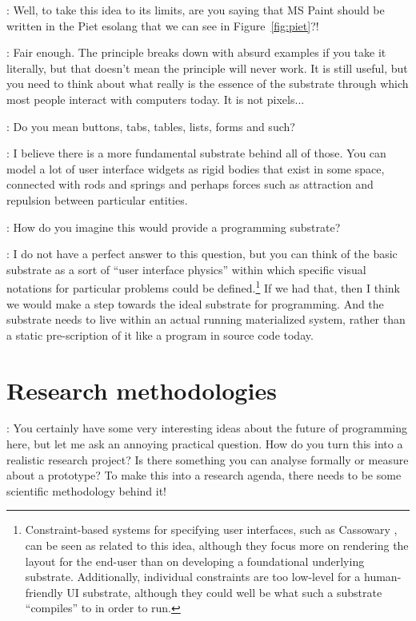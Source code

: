 \documentclass[runningheads]{llncs}
\newcommand{\T}{Tomas}
\newcommand{\J}{Joel}
\newcommand{\says}[2][gg]{\vspace{0.5em}\noindent\hangindent=0.5cm{\textsc{#1}}: #2}
\begin{document}
\says[\T]{Well, to take this idea to its limits, are you saying that MS Paint should be written in the Piet esolang that we can see in Figure~\ref{fig:piet}?!}

\says[\J]{Fair enough. The principle breaks down with absurd examples if you take it literally, but that doesn't mean the principle will never work. It is still useful, but you need to think about what really is the essence of the substrate through which most people interact with computers today. It is not pixels...}

\says[\T]{Do you mean buttons, tabs, tables, lists, forms and such?}

\says[\J]{I believe there is a more fundamental substrate behind all of those. You can model a lot of user interface widgets as rigid bodies that exist in some space, connected with rods and springs and perhaps forces such as attraction and repulsion between particular entities.}

\says[\T]{How do you imagine this would provide a programming substrate?}

\says[\J]{I do not have a perfect answer to this question, but you can think of the basic substrate as a sort of ``user interface physics'' within which specific visual notations for particular problems could be defined.\footnote{Constraint-based systems for specifying user interfaces, such as Cassowary \cite{borning-1997-constraints}, can be seen as related to this idea, although they focus more on rendering the layout for the end-user than on developing a foundational underlying substrate. Additionally, individual constraints are too low-level for a human-friendly UI substrate, although they could well be what such a substrate ``compiles'' to in order to run.} If we had that, then I think we would make a step towards the ideal substrate for programming. And the substrate needs to live within an actual running materialized system, rather than a static pre-scription of it like a program in source code today.}

\section{Research methodologies}

\says[\T]{You certainly have some very interesting ideas about the future of programming here, but let me ask an annoying practical question. How do you turn this into a realistic research project? Is there something you can analyse formally or measure about a prototype? To make this into a research agenda, there needs to be some scientific methodology behind it!}
\end{document}
